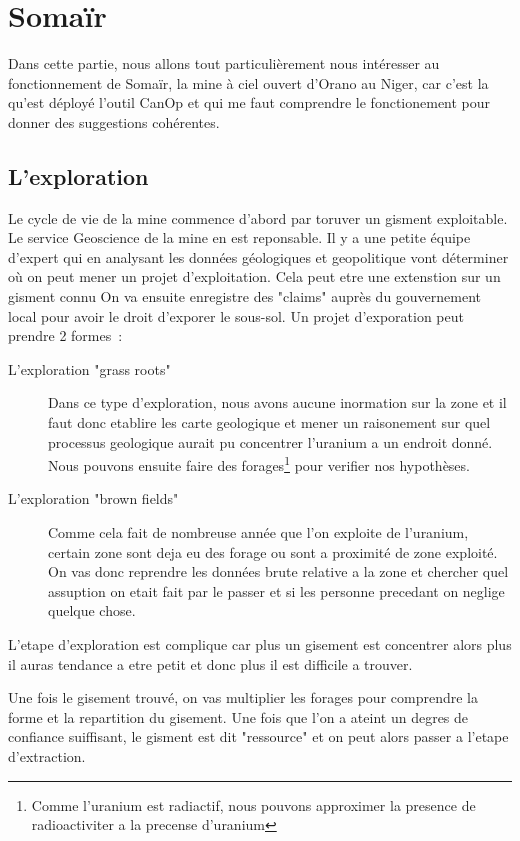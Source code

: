 

\section{Somaïr}
Dans cette partie, nous allons tout particulièrement nous intéresser au fonctionnement de Somaïr, la mine à ciel ouvert d'Orano au Niger, car c'est la qu'est déployé l'outil CanOp et qui me faut comprendre le fonctionement pour donner des suggestions cohérentes.%
\subsection{L'exploration}

Le cycle de vie de la mine commence d'abord par toruver un gisment exploitable. Le service Geoscience de la mine en est reponsable. Il y a une petite équipe d'expert qui en analysant les données géologiques et geopolitique vont déterminer où on peut mener un projet d'exploitation. Cela peut etre une extenstion sur un gisment connu On va ensuite enregistre des "claims" auprès du gouvernement local pour avoir le droit d'exporer le sous-sol. Un projet d'exporation peut prendre 2 formes~:
\begin{description}
    \item[L'exploration "grass roots"] Dans ce type d'exploration, nous avons aucune inormation sur la zone et il faut donc etablire les carte geologique et mener un raisonement sur quel processus geologique aurait pu concentrer l'uranium a un endroit donné. Nous pouvons ensuite faire des forages\footnote{Comme l'uranium est radiactif, nous pouvons approximer la presence de radioactiviter a la precense d'uranium} pour verifier nos hypothèses. %
    \item[L'exploration "brown fields"] Comme cela fait de nombreuse année que l'on exploite de l'uranium, certain zone sont deja eu des forage ou sont a proximité de zone exploité. On vas donc reprendre les données brute relative a la zone et chercher quel assuption on etait fait par le passer et si les personne precedant on neglige quelque chose.
\end{description}
L'etape d'exploration est complique car plus un gisement est concentrer alors plus il auras tendance a etre petit et donc plus il est difficile a trouver.

Une fois le gisement trouvé, on vas multiplier les forages pour comprendre la forme et la repartition du gisement. Une fois que l'on a ateint un degres de confiance suiffisant, le gisment est dit "ressource" et on peut alors passer a l'etape d'extraction.







